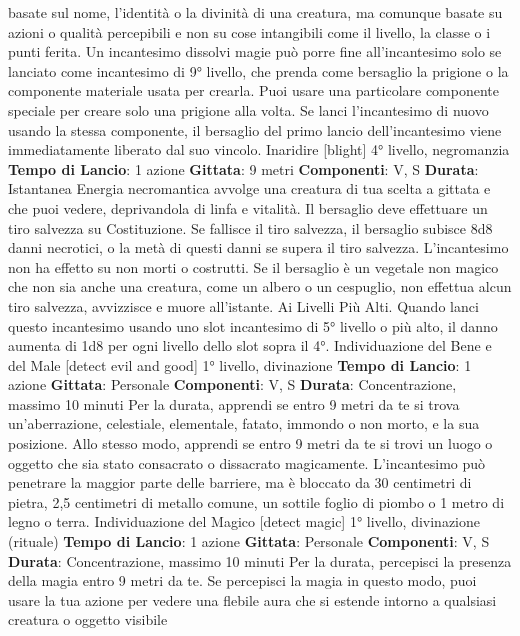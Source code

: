 \begin{multicols}{2}
basate sul nome, l’identità o la divinità di una creatura,
ma comunque basate su azioni o qualità percepibili e
non su cose intangibili come il livello, la classe o i punti
ferita.
Un incantesimo dissolvi magie può porre fine
all’incantesimo solo se lanciato come incantesimo di 9°
livello, che prenda come bersaglio la prigione o la
componente materiale usata per crearla.
Puoi usare una particolare componente speciale per
creare solo una prigione alla volta. Se lanci
l’incantesimo di nuovo usando la stessa componente, il
bersaglio del primo lancio dell’incantesimo viene
immediatamente liberato dal suo vincolo.
Inaridire
[blight]
4° livello, negromanzia
\textbf{Tempo di Lancio}: 1 azione
\textbf{Gittata}: 9 metri
\textbf{Componenti}: V, S
\textbf{Durata}: Istantanea
Energia necromantica avvolge una creatura di tua
scelta a gittata e che puoi vedere, deprivandola di linfa
e vitalità. Il bersaglio deve effettuare un tiro salvezza su
Costituzione. Se fallisce il tiro salvezza, il bersaglio
subisce 8d8 danni necrotici, o la metà di questi danni se
supera il tiro salvezza. L’incantesimo non ha effetto su
non morti o costrutti.
Se il bersaglio è un vegetale non magico che non sia
anche una creatura, come un albero o un cespuglio,
non effettua alcun tiro salvezza, avvizzisce e muore
all’istante.
Ai Livelli Più Alti. Quando lanci questo incantesimo
usando uno slot incantesimo di 5° livello o più alto, il
danno aumenta di 1d8 per ogni livello dello slot sopra il
4°.
Individuazione del Bene e del Male
[detect evil and good]
1° livello, divinazione
\textbf{Tempo di Lancio}: 1 azione
\textbf{Gittata}: Personale
\textbf{Componenti}: V, S
\textbf{Durata}: Concentrazione, massimo 10 minuti
Per la durata, apprendi se entro 9 metri da te si trova
un’aberrazione, celestiale, elementale, fatato, immondo
o non morto, e la sua posizione. Allo stesso modo,
apprendi se entro 9 metri da te si trovi un luogo o
oggetto che sia stato consacrato o dissacrato
magicamente.
L’incantesimo può penetrare la maggior parte delle
barriere, ma è bloccato da 30 centimetri di pietra, 2,5
centimetri di metallo comune, un sottile foglio di piombo
o 1 metro di legno o terra.
Individuazione del Magico
[detect magic]
1° livello, divinazione (rituale)
\textbf{Tempo di Lancio}: 1 azione
\textbf{Gittata}: Personale
\textbf{Componenti}: V, S
\textbf{Durata}: Concentrazione, massimo 10 minuti
Per la durata, percepisci la presenza della magia entro
9 metri da te. Se percepisci la magia in questo modo,
puoi usare la tua azione per vedere una flebile aura che 
si estende intorno a qualsiasi creatura o oggetto visibile

\end{multicols}
